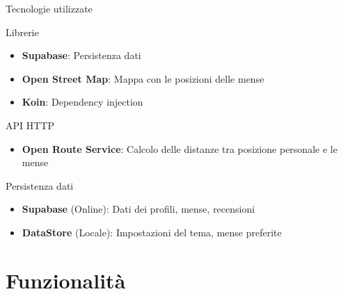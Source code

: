 \documentclass[aspectratio=169]{beamer}
\begin{document}
\begin{frame}{Tecnologie utilizzate}
    \begin{block}{Librerie}
        \begin{itemize}
            \item \textbf{Supabase}: Persistenza dati
            \item \textbf{Open Street Map}: Mappa con le posizioni delle mense
            \item \textbf{Koin}: Dependency injection
        \end{itemize}
    \end{block}
    \vspace{7pt}
    \begin{block}{API HTTP}
        \begin{itemize}
            \item \textbf{Open Route Service}: Calcolo delle distanze tra posizione personale e le mense
        \end{itemize}
    \end{block}
    \vspace{7pt}
    \begin{block}{Persistenza dati}
        \begin{itemize}
            \item \textbf{Supabase} (Online): Dati dei profili, mense, recensioni
            \item \textbf{DataStore} (Locale): Impostazioni del tema, mense preferite
        \end{itemize}
    \end{block}
\end{frame}

\section{Funzionalità}
\end{document}
